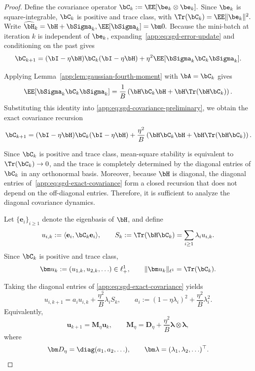 \begin{proof}
Define the covariance operator
\(
\bC_k
:=
\EE[\be_k\otimes\be_k].
\)
Since $\be_k$ is square-integrable, $\bC_k$ is positive and trace
class, with
\(
\Tr(\bC_k)
=
\EE\|\be_k\|^{2}.
\)
Write
\(
\widehat{\bH}_k
=
\bH+\bSigma_k,
\EE[\bSigma_k]=\bm 0.
\)
Because the mini-batch at iteration $k$ is independent of $\be_k$,
expanding~\eqref{app:eq:sgd-error-update} and conditioning on the
past gives
\begin{equation}
\label{app:eq:sgd-covariance-preliminary}
\bC_{k+1}
=
(\bI-\eta\bH)\bC_k(\bI-\eta\bH)
+
\eta^2
\EE[\bSigma_k\bC_k\bSigma_k].
\end{equation}

Applying Lemma~\ref{app:lem:gaussian-fourth-moment} with
$\bA=\bC_k$ gives
\[
\EE[\bSigma_k\bC_k\bSigma_k]
=
\frac1B
\left(
\bH\bC_k\bH
+
\bH\Tr(\bH\bC_k)
\right).
\]
Substituting this identity into
\eqref{app:eq:sgd-covariance-preliminary}, we obtain the exact
covariance recursion
\begin{equation}
\label{app:eq:sgd-exact-covariance}
\bC_{k+1}
=
(\bI-\eta\bH)\bC_k(\bI-\eta\bH)
+
\frac{\eta^2}{B}
\left(
\bH\bC_k\bH
+
\bH\Tr(\bH\bC_k)
\right).
\end{equation}

Since $\bC_k$ is positive and trace class, mean-square stability is equivalent to $\Tr(\bC_k)\to0$, and the trace is completely determined by the diagonal entries of $\bC_k$ in any orthonormal basis. Moreover, because $\bH$ is diagonal, the diagonal entries of~\eqref{app:eq:sgd-exact-covariance} form a closed recursion that does not depend on the off-diagonal entries. Therefore, it is sufficient to analyze the diagonal covariance dynamics.

Let $\{\mathbf e_i\}_{i\geq1}$ denote the eigenbasis of $\bH$, and
define
\[
u_{i,k}
:=
\langle
\mathbf e_i,\bC_k\mathbf e_i
\rangle,
\qquad
S_k
:=
\Tr(\bH\bC_k)
=
\sum_{i\geq1}\lambda_i u_{i,k}.
\]
Since $\bC_k$ is positive and trace class,
\[
\bm u_k
:=
(u_{1,k},u_{2,k},\ldots)
\in\ell_+^1,
\qquad
\|\bm u_k\|_{\ell^1}
=
\Tr(\bC_k).
\]

Taking the diagonal entries of
\eqref{app:eq:sgd-exact-covariance} yields
\begin{equation}
\label{app:eq:sgd-diagonal-recursion}
u_{i,k+1}
=
a_i u_{i,k}
+
\frac{\eta^2}{B}\lambda_i S_k,
\qquad
a_i
:=
(1-\eta\lambda_i)^2
+
\frac{\eta^2}{B}\lambda_i^2.
\end{equation}
Equivalently,
\[
\bm u_{k+1}
=
\bm M_\eta\bm u_k,
\qquad
\bm M_\eta
=
\bm D_\eta
+
\frac{\eta^2}{B}
\bm\lambda\otimes\bm\lambda,
\]
where
\[
\bm D_\eta
=
\diag(a_1,a_2,\ldots),
\qquad
\bm\lambda
=
(\lambda_1,\lambda_2,\ldots)^\top.
\]


\end{proof}
